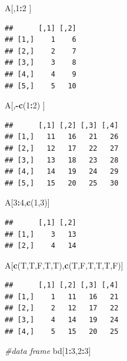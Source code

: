 \documentclass[
]{book}
\newenvironment{Shaded}{\begin{snugshade}}{\end{snugshade}}
\newcommand{\CommentTok}[1]{\textcolor[rgb]{0.56,0.35,0.01}{\textit{#1}}}
\newcommand{\DecValTok}[1]{\textcolor[rgb]{0.00,0.00,0.81}{#1}}
\newcommand{\KeywordTok}[1]{\textcolor[rgb]{0.13,0.29,0.53}{\textbf{#1}}}
\newcommand{\NormalTok}[1]{#1}
\newcommand{\OperatorTok}[1]{\textcolor[rgb]{0.81,0.36,0.00}{\textbf{#1}}}
\begin{document}
\begin{Shaded}
\begin{Highlighting}[]
\NormalTok{A[,}\DecValTok{1}\OperatorTok{:}\DecValTok{2}\NormalTok{ ]}
\end{Highlighting}
\end{Shaded}

\begin{verbatim}
##      [,1] [,2]
## [1,]    1    6
## [2,]    2    7
## [3,]    3    8
## [4,]    4    9
## [5,]    5   10
\end{verbatim}

\begin{Shaded}
\begin{Highlighting}[]
\NormalTok{A[,}\OperatorTok{-}\KeywordTok{c}\NormalTok{(}\DecValTok{1}\OperatorTok{:}\DecValTok{2}\NormalTok{) ]}
\end{Highlighting}
\end{Shaded}

\begin{verbatim}
##      [,1] [,2] [,3] [,4]
## [1,]   11   16   21   26
## [2,]   12   17   22   27
## [3,]   13   18   23   28
## [4,]   14   19   24   29
## [5,]   15   20   25   30
\end{verbatim}

\begin{Shaded}
\begin{Highlighting}[]
\NormalTok{A[}\DecValTok{3}\OperatorTok{:}\DecValTok{4}\NormalTok{,}\KeywordTok{c}\NormalTok{(}\DecValTok{1}\NormalTok{,}\DecValTok{3}\NormalTok{)]}
\end{Highlighting}
\end{Shaded}

\begin{verbatim}
##      [,1] [,2]
## [1,]    3   13
## [2,]    4   14
\end{verbatim}

\begin{Shaded}
\begin{Highlighting}[]
\NormalTok{A[}\KeywordTok{c}\NormalTok{(T,T,F,T,T),}\KeywordTok{c}\NormalTok{(T,F,T,T,T,F)]}
\end{Highlighting}
\end{Shaded}

\begin{verbatim}
##      [,1] [,2] [,3] [,4]
## [1,]    1   11   16   21
## [2,]    2   12   17   22
## [3,]    4   14   19   24
## [4,]    5   15   20   25
\end{verbatim}

\begin{Shaded}
\begin{Highlighting}[]
\CommentTok{#data frame}
\NormalTok{bd[}\DecValTok{1}\OperatorTok{:}\DecValTok{3}\NormalTok{,}\DecValTok{2}\OperatorTok{:}\DecValTok{3}\NormalTok{]}
\end{Highlighting}
\end{Shaded}
\end{document}
